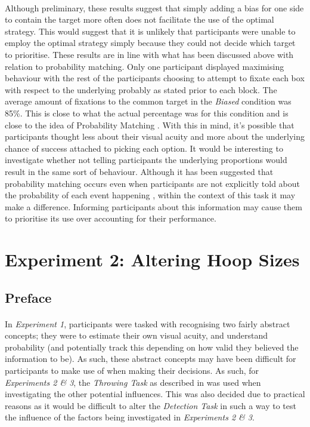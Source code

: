 \documentclass[12pt]{article}
\begin{document}
\paragraph{} Although preliminary, these results suggest that simply adding a bias for one side to contain the target more often does not facilitate the use of the optimal strategy. This would suggest that it is unlikely that participants were unable to employ the optimal strategy simply because they could not decide which target to prioritise. These results are in line with what has been discussed above with relation to probability matching. Only one participant displayed maximising behaviour with the rest of the participants choosing to attempt to fixate each box with respect to the underlying probably as stated prior to each block. The average amount of fixations to the common target in the \textit{Biased} condition was 85\%. This is close to what the actual percentage was for this condition and is close to the idea of Probability Matching \citep{Koehler2010}. With this in mind, it's possible that participants thought less about their visual acuity and more about the underlying chance of success attached to picking each option. It would be interesting to investigate whether not telling participants the underlying proportions would result in the same sort of behaviour. Although it has been suggested that probability matching occurs even when participants are not explicitly told about the probability of each event happening \citep{Gao2015}, within the context of this task it may make a difference. Informing participants about this information may cause them to prioritise its use over accounting for their performance.

\section*{Experiment 2: Altering Hoop Sizes}

\subsection*{Preface}
\paragraph{} In \textit{Experiment 1}, participants were tasked with recognising two fairly abstract concepts; they were to estimate their own visual acuity, and understand probability (and potentially track this depending on how valid they believed the information to be). As such, these abstract concepts may have been difficult for participants to make use of when making their decisions. As such, for \textit{Experiments 2 \& 3}, the \textit{Throwing Task} as described in \cite{clarke2015failure} was used when investigating the other potential influences. This was also decided due to practical reasons as it would be difficult to alter the \textit{Detection Task} in such a way to test the influence of the factors being investigated in \textit{Experiments 2 \& 3}. 
\end{document}
